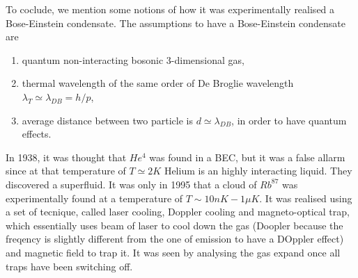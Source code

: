     To coclude, we mention some notions of how it was experimentally realised a Bose-Einstein condensate. The assumptions to have a Bose-Einstein condensate are 
    \begin{enumerate}
        \item quantum non-interacting bosonic $3$-dimensional gas, 
        \item thermal wavelength of the same order of De Broglie wavelength $\lambda_T \simeq \lambda_{DB} = h / p$,
        \item average distance between two particle is $d \simeq \lambda_{DB}$, in order to have quantum effects.
    \end{enumerate}
    In 1938, it was thought that $He^4$ was found in a BEC, but it was a false allarm since at that temperature of $T \simeq 2 K$ Helium is an highly interacting liquid. They discovered a superfluid. It was only in 1995 that a cloud of $Rb^{87}$ was experimentally found at a temperature of $T \sim 10 nK - 1 \mu K$. It was realised using a set of tecnique, called laser cooling, Doppler cooling and magneto-optical trap, which essentially uses beam of laser to cool down the gas (Doopler because the freqency is slightly different from the one of emission to have a DOppler effect) and magnetic field to trap it. It was seen by analysing the gas expand once all traps have been switching off. 
